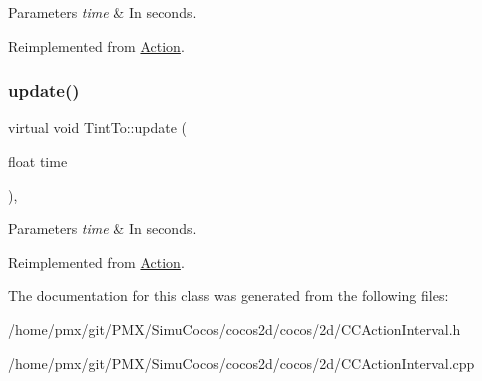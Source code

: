 \begin{DoxyParams}{Parameters}
{\em time} & In seconds. \\
\hline
\end{DoxyParams}


Reimplemented from \hyperlink{classAction_a937e646e63915e33ad05ba149bfcf239}{Action}.

\mbox{\label{classTintTo_a1808cd2d0f0e838614c641374856948b}} 
\subsubsection{\texorpdfstring{update()}{update()}\hspace{0.1cm}{\footnotesize\ttfamily [2/2]}}
{\footnotesize\ttfamily virtual void Tint\+To\+::update (\begin{DoxyParamCaption}\item[{float}]{time }\end{DoxyParamCaption})\hspace{0.3cm}{\ttfamily [override]}, {\ttfamily [virtual]}}


\begin{DoxyParams}{Parameters}
{\em time} & In seconds. \\
\hline
\end{DoxyParams}


Reimplemented from \hyperlink{classAction_a937e646e63915e33ad05ba149bfcf239}{Action}.



The documentation for this class was generated from the following files\+:\begin{DoxyCompactItemize}
\item 
/home/pmx/git/\+P\+M\+X/\+Simu\+Cocos/cocos2d/cocos/2d/C\+C\+Action\+Interval.\+h\item 
/home/pmx/git/\+P\+M\+X/\+Simu\+Cocos/cocos2d/cocos/2d/C\+C\+Action\+Interval.\+cpp\end{DoxyCompactItemize}
